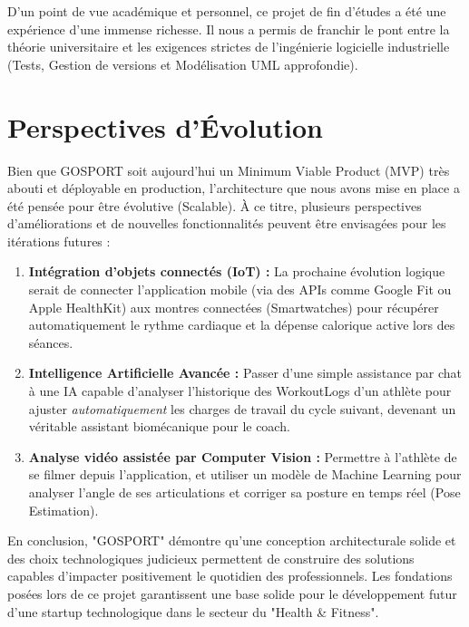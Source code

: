 D'un point de vue académique et personnel, ce projet de fin d'études a été une expérience d'une immense richesse. Il nous a permis de franchir le pont entre la théorie universitaire et les exigences strictes de l'ingénierie logicielle industrielle (Tests, Gestion de versions et Modélisation UML approfondie).

\section*{Perspectives d'Évolution}
\mtcaddsection
Bien que GOSPORT soit aujourd'hui un Minimum Viable Product (MVP) très abouti et déployable en production, l'architecture que nous avons mise en place a été pensée pour être évolutive (Scalable). À ce titre, plusieurs perspectives d'améliorations et de nouvelles fonctionnalités peuvent être envisagées pour les itérations futures :

\begin{enumerate}
    \item \textbf{Intégration d'objets connectés (IoT) :} La prochaine évolution logique serait de connecter l'application mobile (via des APIs comme Google Fit ou Apple HealthKit) aux montres connectées (Smartwatches) pour récupérer automatiquement le rythme cardiaque et la dépense calorique active lors des séances.
    \item \textbf{Intelligence Artificielle Avancée :} Passer d'une simple assistance par chat à une IA capable d'analyser l'historique des WorkoutLogs d'un athlète pour ajuster \textit{automatiquement} les charges de travail du cycle suivant, devenant un véritable assistant biomécanique pour le coach.
    \item \textbf{Analyse vidéo assistée par Computer Vision :} Permettre à l'athlète de se filmer depuis l'application, et utiliser un modèle de Machine Learning pour analyser l'angle de ses articulations et corriger sa posture en temps réel (Pose Estimation).
\end{enumerate}

En conclusion, "GOSPORT" démontre qu'une conception architecturale solide et des choix technologiques judicieux permettent de construire des solutions capables d'impacter positivement le quotidien des professionnels. Les fondations posées lors de ce projet garantissent une base solide pour le développement futur d'une startup technologique dans le secteur du "Health \& Fitness".
